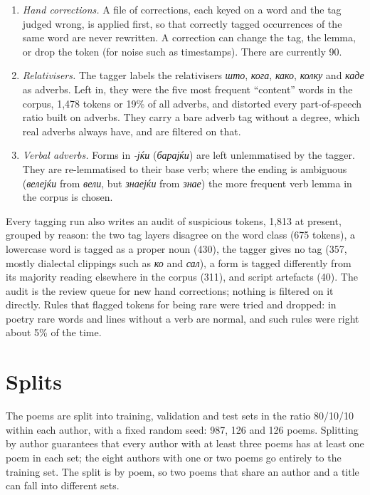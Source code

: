 \begin{enumerate}
  \item \emph{Hand corrections.} A file of corrections, each keyed on a
        word and the tag judged wrong, is applied first, so that correctly
        tagged occurrences of the same word are never rewritten. A
        correction can change the tag, the lemma, or drop the token (for
        noise such as timestamps). There are currently 90.
  \item \emph{Relativisers.} The tagger labels the relativisers
        \emph{што}, \emph{кога}, \emph{како}, \emph{колку} and \emph{каде}
        as adverbs. Left in, they were the five most frequent ``content''
        words in the corpus, 1,478 tokens or 19\% of all adverbs, and
        distorted every part-of-speech ratio built on adverbs. They carry a
        bare adverb tag without a degree, which real adverbs always have,
        and are filtered on that.
  \item \emph{Verbal adverbs.} Forms in \emph{-јќи} (\emph{барајќи}) are
        left unlemmatised by the tagger. They are re-lemmatised to their
        base verb; where the ending is ambiguous (\emph{велејќи} from
        \emph{вели}, but \emph{знаејќи} from \emph{знае}) the more frequent
        verb lemma in the corpus is chosen.
\end{enumerate}

Every tagging run also writes an audit of suspicious tokens, 1,813 at present,
grouped by reason: the two tag layers disagree on the word
class (675 tokens), a lowercase word is tagged as a proper noun (430), the
tagger gives no tag (357, mostly dialectal clippings such as \emph{ко} and
\emph{сал}), a form is tagged differently from its majority reading
elsewhere in the corpus (311), and script artefacts (40). The audit is the
review queue for new hand corrections; nothing is filtered on it directly.
Rules that flagged tokens for being rare were tried and dropped: in poetry
rare words and lines without a verb are normal, and such rules were right
about 5\% of the time.

\section{Splits}

The poems are split into training, validation and test sets in the ratio
80/10/10 within each author, with a fixed random seed: 987, 126 and 126
poems. Splitting by author guarantees that every author with at least three
poems has at least one poem in each set; the eight authors with one or two
poems go entirely to the training set. The split is by poem, so two poems
that share an author and a title can fall into different sets.

